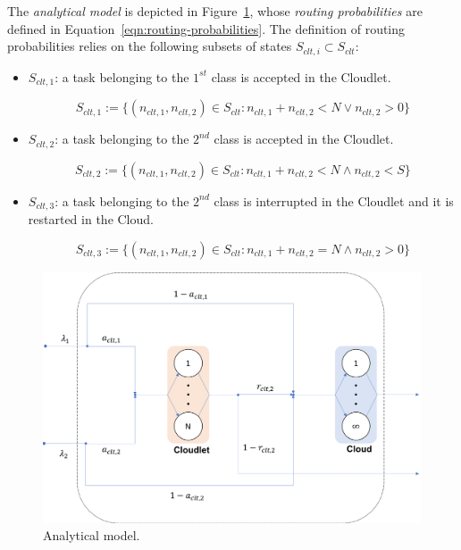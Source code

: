 The \textit{analytical model} is depicted in Figure~\ref{fig:analytical-model}, whose \textit{routing probabilities} are defined in Equation~\ref{eqn:routing-probabilities}.
The definition of routing probabilities relies on the following subsets of states $S_{clt,i} \subset S_{clt}$:

\begin{itemize}
	\item $S_{clt,1}$:  a task belonging to the $1^{st}$ class is accepted in the Cloudlet.
	
	\begin{equation}
	S_{clt,1} := \{(n_{clt,1},n_{clt,2})\in S_{clt} : n_{clt,1}+n_{clt,2}<N \vee n_{clt,2}>0\}
	\end{equation}
	
	\item $S_{clt,2}$: a task belonging to the $2^{nd}$ class is accepted in the Cloudlet.
	
	\begin{equation}
	S_{clt,2} := \{(n_{clt,1},n_{clt,2})\in S_{clt} : n_{clt,1}+n_{clt,2}<N \wedge n_{clt,2}<S\}
	\end{equation}
	
	\item $S_{clt,3}$: a task belonging to the $2^{nd}$ class is interrupted in the Cloudlet and it is restarted in the Cloud.
	
	\begin{equation}
	S_{clt,3} := \{(n_{clt,1},n_{clt,2})\in S_{clt} : n_{clt,1}+n_{clt,2}=N \wedge n_{clt,2}>0\}
	\end{equation}
\end{itemize}

\begin{figure}
	\includegraphics[width=\columnwidth]{fig/analytical-model}
	\caption{Analytical model.}
	\label{fig:analytical-model}
\end{figure}

